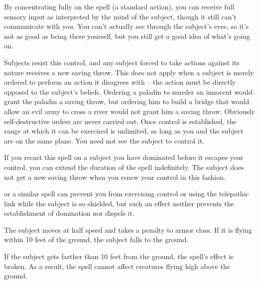 \begin{spelleffect}
  \par By concentrating fully on the spell (a standard action), you can receive full sensory input as interpreted by the mind of the subject, though it still can't communicate with you. You can't actually see through the subject's eyes, so it's not as good as being there yourself, but you still get a good idea of what's going on.
  \par Subjects resist this control, and any subject forced to take actions against its nature receives a new saving throw. This does not apply when a subject is merely ordered to perform an action it disagrees with -- the action must be directly opposed to the subject's beliefs. Ordering a paladin to murder an innocent would grant the paladin a saving throw, but ordering him to build a bridge that would allow an evil army to cross a river would not grant him a saving throw. Obviously self-destructive orders are never carried out. Once control is established, the range at which it can be exercised is unlimited, as long as you and the subject are on the same plane. You need not see the subject to control it.
  \par If you recast this spell on a subject you have dominated before it escapes your control, you can extend the duration of the spell indefinitely. The subject does not get a new saving throw when you renew your control in this fashion.
\end{spelleffect}
\begin{spellnotes}
   or a similar spell can prevent you from exercising control or using the telepathic link while the subject is so shielded, but such an effect neither prevents the establishment of domination nor dispels it.
\end{spellnotes}

\begin{comment}
\subsubsection{E}
\end{comment}

\spellrng{\rngmed}
\spelldur{\durshort}
\begin{spelleffect}
  The subject moves at half speed and takes a  penalty to armor class. If it is flying within 10 feet of the ground, the subject falls to the ground.
\end{spelleffect}
\begin{spellnotes}
  If the subject gets farther than 10 feet from the ground, the spell's effect is broken. As a result, the spell cannot affect creatures flying high above the ground.
\end{spellnotes}


